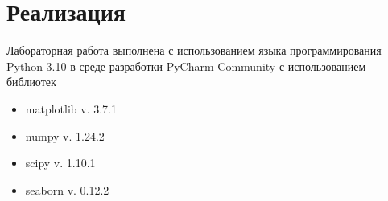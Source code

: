 \section{Реализация}
Лабораторная работа выполнена с использованием языка программирования Python 3.10 в среде разработки PyCharm Community с использованием библиотек

\begin{itemize}
	\item matplotlib v. 3.7.1
	\item numpy v. 1.24.2
	\item scipy v. 1.10.1
	\item seaborn v. 0.12.2
\end{itemize}

\newpage
